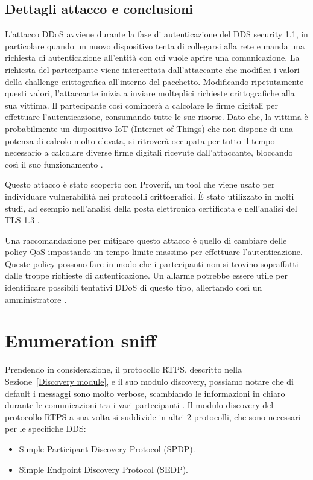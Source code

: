 \subsection{Dettagli attacco e conclusioni}
L'attacco DDoS avviene durante la fase di autenticazione del
DDS security 1.1, in particolare quando un nuovo dispositivo tenta di
collegarsi alla rete e manda una richiesta di autenticazione
all'entità con cui vuole aprire una comunicazione. 
La richiesta del partecipante viene intercettata
dall'attaccante che modifica i valori della challenge crittografica 
all'interno del pacchetto. Modificando ripetutamente questi valori, l'attaccante
inizia a inviare molteplici richieste crittografiche alla sua vittima.
Il partecipante così comincerà a calcolare le firme digitali per effettuare
l'autenticazione, consumando tutte le sue risorse.
Dato che, la vittima è probabilmente un dispositivo IoT
(Internet of Things)
che non dispone di una potenza di calcolo molto elevata, si ritroverà
occupata per tutto il tempo necessario a calcolare diverse firme digitali
ricevute dall'attaccante, bloccando così il suo funzionamento
\cite{DBLP:conf/asiaccs/WangLG24}.


Questo attacco è stato scoperto con Proverif, un tool che viene usato
per individuare vulnerabilità nei protocolli crittografici. 
È stato utilizzato in molti studi, ad esempio nell'analisi della 
posta elettronica certificata e nell'analisi del TLS 1.3 \cite{proverifmanual}.

Una raccomandazione per mitigare questo attacco è quello di cambiare delle
policy QoS impostando un tempo limite massimo per effettuare
l'autenticazione. Queste policy possono fare in modo
che i partecipanti non si trovino sopraffatti dalle troppe richieste di
autenticazione. Un allarme potrebbe essere utile per identificare possibili
tentativi DDoS di questo tipo, allertando così un amministratore
\cite{DBLP:conf/asiaccs/WangLG24}.


\section{Enumeration sniff}
Prendendo in considerazione, il protocollo RTPS,
descritto nella Sezione~\ref{Discovery module}, e il suo modulo discovery,
possiamo notare che di default i messaggi sono molto verbose, 
scambiando le informazioni in
chiaro durante le comunicazioni tra i vari partecipanti \cite{White2017AnII}.
Il modulo 
discovery del protocollo RTPS a sua volta si suddivide in
altri 2 protocolli, che sono necessari per le specifiche DDS:
\begin{itemize}
    \item Simple Participant Discovery Protocol (SPDP).
    \item Simple Endpoint Discovery Protocol (SEDP).
\end{itemize}



